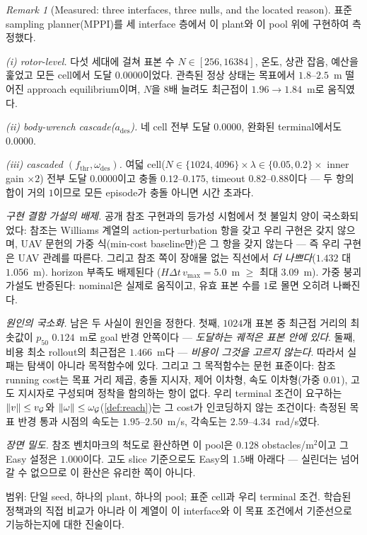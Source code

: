 \documentclass[11pt]{article}
\theoremstyle{plain}
\theoremstyle{definition}
\theoremstyle{remark}
\newtheorem{remark}[theorem]{Remark}
\DeclarePairedDelimiter{\norm}{\lVert}{\rVert}
\begin{document}
\begin{remark}[Measured: three interfaces, three nulls, and the located reason]\label{rem:rotor-measure}
표준 sampling planner(MPPI)를 세 interface 층에서 이 plant와 이 pool 위에 구현하여 측정했다.

\emph{(i) rotor-level.} 다섯 세대에 걸쳐 표본 수 $N\in[256,16384]$, 온도, 상관 잡음, 예산을
훑었고 모든 cell에서 도달 $0.0000$이었다. 관측된 정상 상태는 목표에서 $1.8$--$2.5$~m 떨어진
approach equilibrium이며, $N$을 $8$배 늘려도 최근접이 $1.96\to1.84$~m로 움직였다.

\emph{(ii) body-wrench cascade($a_{\mathrm{des}}$).} 네 cell 전부 도달 $0.0000$, 완화된
terminal에서도 $0.0000$.

\emph{(iii) cascaded $(f_{\mathrm{thr}},\omega_{\mathrm{des}})$.} 여덟 cell($N\in\{1024,4096\}
\times\lambda\in\{0.05,0.2\}\times$ inner gain $\times2$) 전부 도달 $0.0000$이고 충돌
$0.12$--$0.175$, timeout $0.82$--$0.88$이다 --- 두 항의 합이 거의 $1$이므로 모든 episode가
충돌 아니면 시간 초과다.

\emph{구현 결함 가설의 배제.} 공개 참조 구현과의 등가성 시험에서 첫 불일치 양이 국소화되었다:
참조는 Williams 계열의 action-perturbation 항을 갖고 우리 구현은 갖지 않으며, UAV 문헌의 가중
식(min-cost baseline만)은 그 항을 갖지 않는다 --- 즉 우리 구현은 UAV 관례를 따른다. 그리고
참조 쪽이 장애물 없는 직선에서 \emph{더 나쁘다}($1.432$ 대 $1.056$~m). horizon 부족도 배제된다
($H\Delta t\,v_{\max}=5.0$~m $\ge$ 최대 $3.09$~m). 가중 붕괴 가설도 반증된다: nominal은 실제로
움직이고, 유효 표본 수를 $1$로 몰면 오히려 나빠진다.

\emph{원인의 국소화.} 남은 두 사실이 원인을 정한다. 첫째, $1024$개 표본 중 최근접 거리의
최솟값이 $p_{50}$ $0.124$~m로 goal 반경 안쪽이다 --- \emph{도달하는 궤적은 표본 안에 있다}.
둘째, 비용 최소 rollout의 최근접은 $1.466$~m다 --- \emph{비용이 그것을 고르지 않는다}. 따라서
실패는 탐색이 아니라 목적함수에 있다. 그리고 그 목적함수는 문헌 표준이다: 참조 running cost는
목표 거리 제곱, 충돌 지시자, 제어 이차형, 속도 이차형(가중 $0.01$), 고도 지시자로 구성되며
정착을 함의하는 항이 없다. 우리 terminal 조건이 요구하는 $\norm v\le v_{\mathcal G}$와
$\norm\omega\le\omega_{\mathcal G}$(\cref{def:reach})는 그 cost가 인코딩하지 않는 조건이다:
측정된 목표 반경 통과 시점의 속도는 $1.95$--$2.50$~m/s, 각속도는 $2.59$--$4.34$~rad/s였다.

\emph{장면 밀도.} 참조 벤치마크의 척도로 환산하면 이 pool은 $0.128$ obstacles/m$^2$이고 그
Easy 설정은 $1.000$이다. 고도 slice 기준으로도 Easy의 $1.5$배 아래다 --- 실린더는 넘어갈 수
없으므로 이 환산은 유리한 쪽이 아니다.

범위: 단일 seed, 하나의 plant, 하나의 pool; 표준 cell과 우리 terminal 조건. 학습된 정책과의
직접 비교가 아니라 이 계열이 이 interface와 이 목표 조건에서 기준선으로 기능하는지에 대한 진술이다.
\end{remark}
\end{document}
